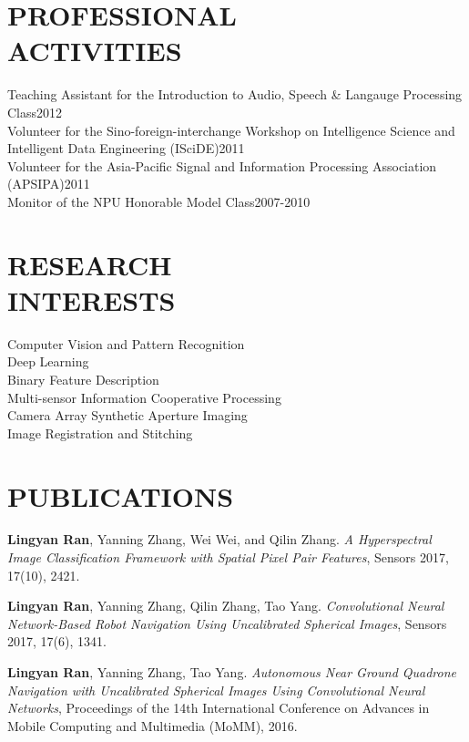 \documentclass[margin]{res}
\begin{document}
\begin{resume}
\section{PROFESSIONAL\\ACTIVITIES}
                Teaching Assistant for the Introduction to Audio, Speech \& Langauge Processing Class\hfill 2012\\
                Volunteer for the Sino-foreign-interchange Workshop on Intelligence Science and Intelligent Data Engineering (ISciDE)\hfill 2011\\
                Volunteer for the Asia-Pacific Signal and Information Processing Association (APSIPA)\hfill 2011\\
                Monitor of the NPU Honorable Model Class\hfill 2007-2010

\section{RESEARCH \\INTERESTS}
                Computer Vision and Pattern Recognition\\
                Deep Learning\\
                Binary Feature Description\\
                Multi-sensor Information Cooperative Processing\\
                Camera Array Synthetic Aperture Imaging\\
                Image Registration and Stitching

\section{PUBLICATIONS}

	\textbf{Lingyan Ran}, Yanning Zhang, Wei Wei, and Qilin Zhang. \textit{A Hyperspectral Image Classification Framework with Spatial Pixel Pair Features}, Sensors 2017, 17(10), 2421.

	\textbf{Lingyan Ran}, Yanning Zhang, Qilin Zhang, Tao Yang. \textit{Convolutional Neural Network-Based Robot Navigation Using Uncalibrated Spherical Images}, Sensors 2017, 17(6), 1341.

	\textbf{Lingyan Ran}, Yanning Zhang, Tao Yang. \textit{Autonomous Near Ground Quadrone Navigation
 with Uncalibrated Spherical Images Using Convolutional Neural Networks}, Proceedings of the 14th International Conference on Advances in Mobile Computing and Multimedia (MoMM), 2016.


\end{resume}
\end{document}
